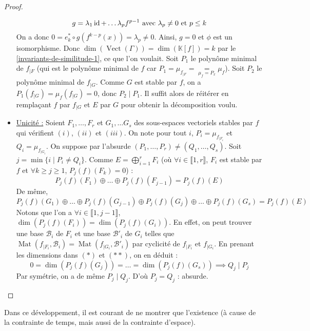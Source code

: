 \begin{proof}
\begin{itemize}
			\[ g = \lambda_1 \operatorname{id} + \dots \lambda_p f^{p-1} \text{ avec } \lambda_p \neq 0 \text{ et } p \leq k \]
			On a donc $0 = e_k^* \circ g(f^{k-p} (x)) = \lambda_p \neq 0$. Ainsi, $g = 0$ et $\phi$ est un isomorphisme. Donc $\dim(\operatorname{Vect}(\Gamma)) = \dim(\mathbb{K}[f]) = k$ par le \cref{invariants-de-similitude-1}, ce que l'on voulait.
			\newpar
			Soit $P_1$ le polynôme minimal de $f_{|F}$ (qui est le polynôme minimal de $f$ car $P_1 = \mu_{f_{|F}} = \underset{\mu_f = P_x}{=} \mu_f$). Soit $P_2$ le polynôme minimal de $f_{|G}$. Comme $G$ est stable par $f$, on a $P_1(f_{|G}) = \mu_f(f_{|G}) = 0$, donc $P_2 \mid P_1$. Il suffit alors de réitérer en remplaçant $f$ par $f_{|G}$ et $E$ par $G$ pour obtenir la décomposition voulu.
			\item \uline{Unicité :} Soient $F_1, \dots, F_r$ et $G_1, \dots G_s$ des sous-espaces vectoriels stables par $f$ qui vérifient $(i)$, $(ii)$ et $(iii)$. On note pour tout $i$, $P_i = \mu_{f_{|F_i}}$ et $Q_i = \mu_{f_{|G_i}}$. On suppose par l'absurde $(P_1, \dots, P_r) \neq (Q_1, \dots, Q_s)$. Soit $j = \min\{ i \mid P_i \neq Q_i \}$.
			Comme $E = \bigoplus_{i = 1}^r F_i$ (où $\forall i \in \llbracket 1, r \rrbracket$, $F_i$ est stable par $f$ et $\forall k \geq j \geq 1$, $P_j(f)(F_k) = 0$) :
			\[ P_j(f)(F_1) \oplus \dots \oplus P_j(f)(F_{j-1}) = P_j(f)(E) \tag{$*$} \]
			De même,
			\[ P_j(f)(G_1) \oplus \dots \oplus P_j(f)(G_{j-1}) \oplus P_j(f)(G_j) \oplus \dots \oplus P_j(f)(G_s) = P_j(f)(E) \tag{$**$} \]
			Notons que l'on a $\forall i \in \llbracket 1, j-1 \rrbracket$, $\dim(P_j(f)(F_i)) = \dim(P_j(f)(G_i))$. En effet, on peut trouver une base $\mathcal{B}_i$ de $F_i$ et une base $\mathcal{B}'_i$ de $G_i$ telles que $\operatorname{Mat}(f_{|F_i}, \mathcal{B}_i) = \operatorname{Mat}(f_{|G_i}, \mathcal{B}'_i)$ par cyclicité de $f_{|F_i}$ et $f_{|G_i}$. En prenant les dimensions dans $(*)$ et $(**)$, on en déduit :
			\[ 0 = \dim(P_j(f)(G_j)) = \dots = \dim(P_j(f)(G_s)) \implies Q_j \mid P_j \]
			Par symétrie, on a de même $P_j \mid Q_j$. D'où $P_j = Q_j$ : absurde.
		\end{itemize}
	\end{proof}

	\begin{remark}
		Dans ce développement, il est courant de ne montrer que l'existence (à cause de la contrainte de temps, mais aussi de la contrainte d'espace).
	\end{remark}

